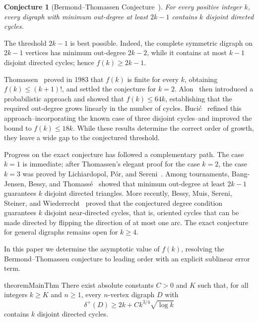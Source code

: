 \documentclass[a4paper,12pt]{article}
\newtheorem{theorem}{Theorem}[section]
\newtheorem{conjecture}[theorem]{Conjecture}
\numberwithin{equation}{section}
\newcommand{\jbjcomment}[1]{\textcolor{blue}{JBJ: #1}}
\begin{document}
\begin{conjecture}[Bermond--Thomassen Conjecture~\cite{bermondJGT5}]
For every positive integer $k$, every digraph with minimum out-degree
at least $2k-1$ contains $k$ disjoint directed cycles.
\end{conjecture}


The threshold $2k-1$ is best possible. Indeed, the complete symmetric
digraph on $2k-1$ vertices has minimum out-degree $2k-2$, while it contains at most
$k-1$ disjoint directed cycles; hence $f(k)\ge2k-1$. 



Thomassen~\cite{thomassenC3} proved in 1983 that $f(k)$ is finite for every
$k$, obtaining $f(k)\le(k+1)!$, and settled the conjecture for $k=2$.
Alon~\cite{alonJCTB68} then introduced a probabilistic approach and showed
that $f(k)\le64k$, establishing that the required out-degree grows
linearly in the number of cycles. Buci\'c~\cite{bucicDM341} refined this
approach--incorporating the known case of three disjoint cycles--and
improved the bound to $f(k)\le18k$. While these results determine the
correct order of growth, they leave a wide gap to the conjectured
threshold.



Progress on the exact conjecture has followed a complementary path. The
case $k=1$ is immediate; after Thomassen's elegant proof for the case $k=2$, the case $k=3$
was proved by Lichiardopol, P\'or, and Sereni~\cite{lichiardopolSJDM23}. Among
tournaments, Bang-Jensen, Bessy, and Thomass\'e~\cite{bangjensenJGT75} showed
that minimum out-degree at least $2k-1$ guarantees $k$ disjoint
directed triangles. More recently, Bessy, Muis, Sereni, Steiner, and
Wiederrecht~\cite{bessyARX26} proved that the conjectured degree condition
guarantees $k$ disjoint near-directed cycles, that is, oriented cycles that can be made directed by flipping the direction of at most one arc. The exact conjecture for
general digraphs remains open for $k\ge4$.


\medskip
In this paper we determine the asymptotic value of $f(k)$, resolving
the Bermond--Thomassen conjecture to leading order with an explicit
sublinear error term.%


\begin{restatable}{theorem}{MainThm}\label{thm:main}
    There exist absolute constants $C>0$ and $K$ such that, for all
integers $k\ge K$ and $n\ge1$, every $n$-vertex digraph $D$ with
$$
\delta^+(D)\ge 2k+Ck^{3/4}\sqrt{\log k}
$$
contains $k$ disjoint directed cycles.
\end{restatable}

\end{document}
